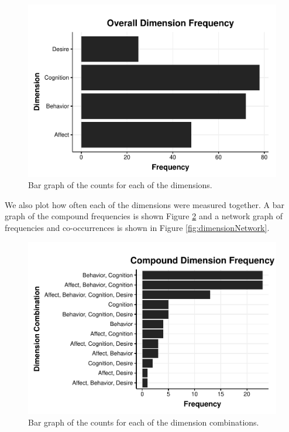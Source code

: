 \documentclass[
  american,
  man]{apa7}
\begin{document}
\begin{figure}
\includegraphics[width=\textwidth]{Figures/ABCDFreq-1} \caption{Bar graph of the counts for each of the dimensions.}\label{fig:ABCDFreq}
\end{figure}

We also plot how often each of the dimensions were measured together. A bar graph of the compound frequencies is shown Figure \ref{fig:ABCDCombFreq} and a network graph of frequencies and co-occurrences is shown in Figure \ref{fig:dimensionNetwork}.

\begin{figure}
\includegraphics[width=\textwidth]{Figures/ABCDCombFreq-1} \caption{Bar graph of the counts for each of the dimension combinations.}\label{fig:ABCDCombFreq}
\end{figure}
\end{document}
